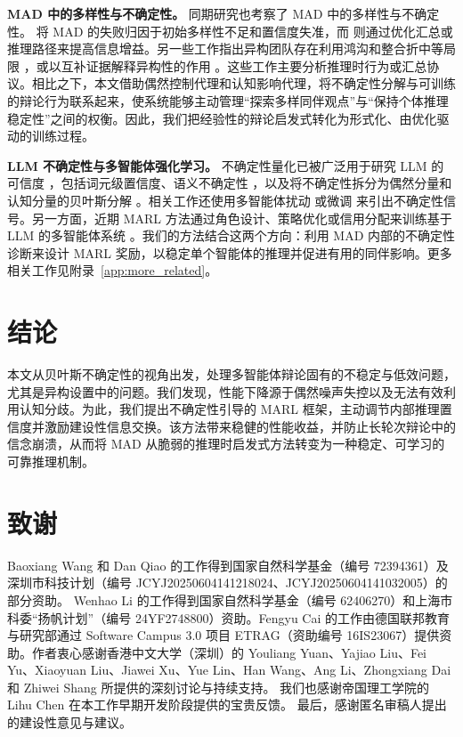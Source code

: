\documentclass{article}
\theoremstyle{plain}
\theoremstyle{definition}
\theoremstyle{remark}
\begin{document}
\textbf{MAD 中的多样性与不确定性。}
同期研究也考察了 MAD 中的多样性与不确定性。\citet{zhu2026demystifying} 将 MAD 的失败归因于初始多样性不足和置信度失准，而 \citet{ai2025beyond,li2026dynadebate} 则通过优化汇总或推理路径来提高信息增益。另一些工作指出异构团队存在利用鸿沟和整合折中等局限 \cite{li2026m3mad,pappu2026multi}，或以互补证据解释异构性的作用 \cite{yang2026understanding}。这些工作主要分析推理时行为或汇总协议。相比之下，本文借助偶然控制代理和认知影响代理，将不确定性分解与可训练的辩论行为联系起来，使系统能够主动管理“探索多样同伴观点”与“保持个体推理稳定性”之间的权衡。因此，我们把经验性的辩论启发式转化为形式化、由优化驱动的训练过程。

\textbf{LLM 不确定性与多智能体强化学习。}
不确定性量化已被广泛用于研究 LLM 的可信度 \cite{huang2025look}，包括词元级置信度、语义不确定性 \cite{kuhnsemantic, wang2025measuring}，以及将不确定性拆分为偶然分量和认知分量的贝叶斯分解 \cite{liu2025uncertainty, huang2024survey, geng2024confidencesurvey, abbasi2024believe, jayasekera2025variational, ling2024uncertainty}。相关工作还使用多智能体扰动 \cite{amayuelas2024knowledge} 或微调 \cite{feng2025rethinking} 来引出不确定性信号。另一方面，近期 MARL 方法通过角色设计、策略优化或信用分配来训练基于 LLM 的多智能体系统 \cite{park2025maporl,liao2025marft,liu2025llm,zhao2025stronger}。我们的方法结合这两个方向：利用 MAD 内部的不确定性诊断来设计 MARL 奖励，以稳定单个智能体的推理并促进有用的同伴影响。更多相关工作见附录~\ref{app:more_related}。







\section{结论}
本文从贝叶斯不确定性的视角出发，处理多智能体辩论固有的不稳定与低效问题，尤其是异构设置中的问题。我们发现，性能下降源于偶然噪声失控以及无法有效利用认知分歧。为此，我们提出不确定性引导的 MARL 框架，主动调节内部推理置信度并激励建设性信息交换。该方法带来稳健的性能收益，并防止长轮次辩论中的信念崩溃，从而将 MAD 从脆弱的推理时启发式方法转变为一种稳定、可学习的可靠推理机制。



\clearpage

\section*{致谢}
Baoxiang Wang 和 Dan Qiao 的工作得到国家自然科学基金（编号 72394361）及深圳市科技计划（编号 JCYJ20250604141218024、JCYJ20250604141032005）的部分资助。
Wenhao Li 的工作得到国家自然科学基金（编号 62406270）和上海市科委“扬帆计划”（编号 24YF2748800）资助。Fengyu Cai 的工作由德国联邦教育与研究部通过 Software Campus 3.0 项目 ETRAG（资助编号 16IS23067）提供资助。作者衷心感谢香港中文大学（深圳）的 Youliang Yuan、Yajiao Liu、Fei Yu、Xiaoyuan Liu、Jiawei Xu、Yue Lin、Han Wang、Ang Li、Zhongxiang Dai 和 Zhiwei Shang 所提供的深刻讨论与持续支持。
我们也感谢帝国理工学院的 Lihu Chen 在本工作早期开发阶段提供的宝贵反馈。
最后，感谢匿名审稿人提出的建设性意见与建议。
\end{document}
